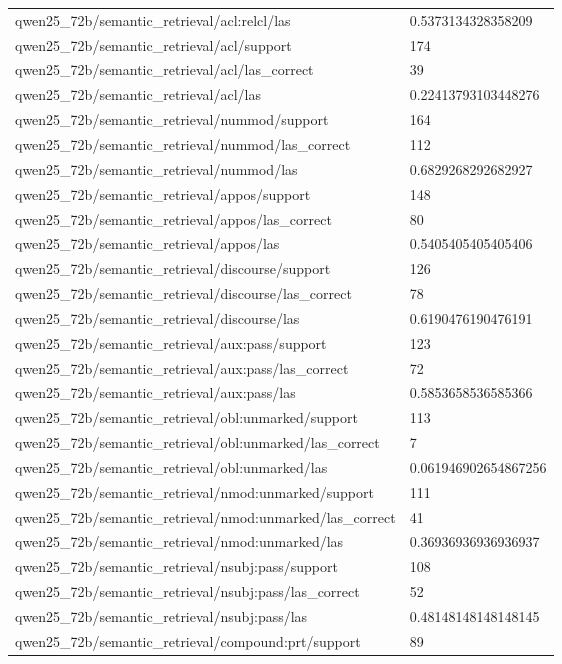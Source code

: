 \begin{tabular}{ll}
qwen25\_72b/semantic\_retrieval/acl:relcl/las & 0.5373134328358209 \\
qwen25\_72b/semantic\_retrieval/acl/support & 174 \\
qwen25\_72b/semantic\_retrieval/acl/las\_correct & 39 \\
qwen25\_72b/semantic\_retrieval/acl/las & 0.22413793103448276 \\
qwen25\_72b/semantic\_retrieval/nummod/support & 164 \\
qwen25\_72b/semantic\_retrieval/nummod/las\_correct & 112 \\
qwen25\_72b/semantic\_retrieval/nummod/las & 0.6829268292682927 \\
qwen25\_72b/semantic\_retrieval/appos/support & 148 \\
qwen25\_72b/semantic\_retrieval/appos/las\_correct & 80 \\
qwen25\_72b/semantic\_retrieval/appos/las & 0.5405405405405406 \\
qwen25\_72b/semantic\_retrieval/discourse/support & 126 \\
qwen25\_72b/semantic\_retrieval/discourse/las\_correct & 78 \\
qwen25\_72b/semantic\_retrieval/discourse/las & 0.6190476190476191 \\
qwen25\_72b/semantic\_retrieval/aux:pass/support & 123 \\
qwen25\_72b/semantic\_retrieval/aux:pass/las\_correct & 72 \\
qwen25\_72b/semantic\_retrieval/aux:pass/las & 0.5853658536585366 \\
qwen25\_72b/semantic\_retrieval/obl:unmarked/support & 113 \\
qwen25\_72b/semantic\_retrieval/obl:unmarked/las\_correct & 7 \\
qwen25\_72b/semantic\_retrieval/obl:unmarked/las & 0.061946902654867256 \\
qwen25\_72b/semantic\_retrieval/nmod:unmarked/support & 111 \\
qwen25\_72b/semantic\_retrieval/nmod:unmarked/las\_correct & 41 \\
qwen25\_72b/semantic\_retrieval/nmod:unmarked/las & 0.36936936936936937 \\
qwen25\_72b/semantic\_retrieval/nsubj:pass/support & 108 \\
qwen25\_72b/semantic\_retrieval/nsubj:pass/las\_correct & 52 \\
qwen25\_72b/semantic\_retrieval/nsubj:pass/las & 0.48148148148148145 \\
qwen25\_72b/semantic\_retrieval/compound:prt/support & 89 \\

\end{tabular}
